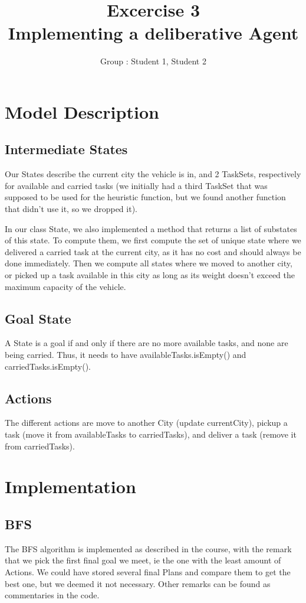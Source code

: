 \documentclass[11pt]{article}
\title{\bf Excercise 3\\ Implementing a deliberative Agent}
\author{Group \textnumero : Student 1, Student 2}
\begin{document}
\maketitle

\section{Model Description}

\subsection{Intermediate States}
Our States describe the current city the vehicle is in, and 2 TaskSets, respectively for available and carried tasks (we initially had a third TaskSet that was supposed to be used for the heuristic function, but we found another function that didn't use it, so we dropped it).

In our class State, we also implemented a method that returns a list of substates of this state. To compute them, we first compute the set of unique state where we delivered a carried task at the current city, as it has no cost and should always be done immediately. Then we compute all states where we moved to another city, or picked up a task available in this city as long as its weight doesn't exceed the maximum capacity of the vehicle.

\subsection{Goal State}
A State is a goal if and only if there are no more available tasks, and none are being carried. Thus, it needs to have availableTasks.isEmpty() and carriedTasks.isEmpty().

\subsection{Actions}
The different actions are move to another City (update currentCity), pickup a task (move it from availableTasks to carriedTasks), and deliver a task (remove it from carriedTasks).


\section{Implementation}

\subsection{BFS}
The BFS algorithm is implemented as described in the course, with the remark that we pick the first final goal we meet, ie the one with the least amount of Actions. We could have stored several final Plans and compare them to get the best one, but we deemed it not necessary. Other remarks can be found as commentaries in the code.
\end{document}
